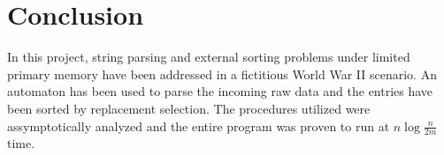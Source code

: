 \documentclass[10pt,a4paper]{article}
\numberwithin{equation}{section}
\begin{document}
\section{Conclusion}

In this project, string parsing and external sorting problems under limited primary memory have been addressed in a fictitious World War II scenario. An automaton has been used to parse the incoming raw data and the entries have been sorted by replacement selection. The procedures utilized were assymptotically analyzed and the entire program was proven to run at $n\log{\frac{n}{2m}}$ time.
\end{document}
